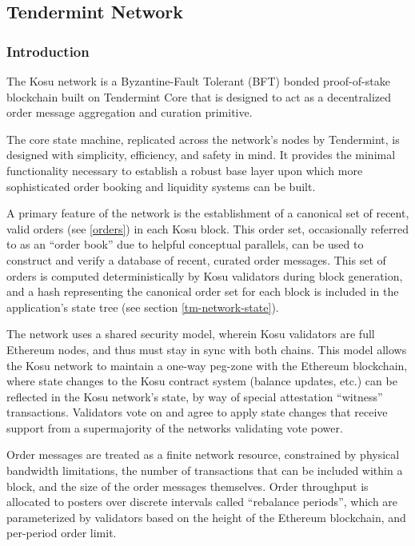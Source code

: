 \documentclass[10pt]{article}
\begin{document}

\subsection{Tendermint Network}\label{tm-network}
\subsubsection{Introduction}\label{tm-network-intro}
The Kosu network is a Byzantine-Fault Tolerant (BFT) bonded proof-of-stake blockchain built on Tendermint Core that is designed to act as a decentralized order message aggregation and curation primitive.
\medskip 

The core state machine, replicated across the network’s nodes by Tendermint, is designed with simplicity, efficiency, and safety in mind. It provides the minimal functionality necessary to establish a robust base layer upon which more sophisticated order booking and liquidity systems can be built.
\medskip

A primary feature of the network is the establishment of a canonical set of recent, valid  orders (see \ref{orders}) in each Kosu block. This order set, occasionally referred to as an “order book” due to helpful conceptual parallels, can be used to construct and verify a database of recent, curated order messages. This set of orders is computed deterministically by Kosu validators during block generation, and a hash representing the canonical order set for each block is included in the application’s state tree (see section \ref{tm-network-state}).
\medskip

The network uses a shared security model, wherein Kosu validators are full Ethereum nodes, and thus must stay in sync with both chains. This model allows the Kosu network to maintain a one-way peg-zone with the Ethereum blockchain, where state changes to the Kosu contract system (balance updates, etc.) can be reflected in the Kosu network’s state, by way of special attestation “witness” transactions. Validators vote on and agree to apply state changes that receive support from a supermajority of the networks validating vote power.
\medskip

Order messages are treated as a finite network resource, constrained by physical bandwidth limitations, the number of transactions that can be included within a block, and the size of the order messages themselves. Order throughput is allocated to posters over discrete intervals called “rebalance periods”, which are parameterized by validators based on the height of the Ethereum blockchain, and per-period order limit.
\medskip
\end{document}

